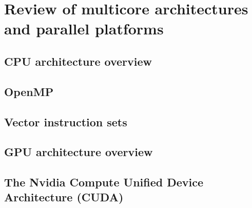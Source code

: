 \chapter{Review of multicore architectures and parallel platforms}
\section{CPU architecture overview}
\section{OpenMP}
\section{Vector instruction sets}
\section{GPU architecture overview} 
\section{The Nvidia Compute Unified Device Architecture (CUDA)}
